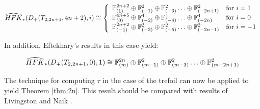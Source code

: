 





\begin{prop}
\label{prop:Kstart}
$$ \HFKa_*(D_+(T_{2,2n+1},4n+2),i)\cong 
\left\{\begin{array}{ll}

	\F_{(1)}^{2n+2}\oplus\F_{(-1)}^2\oplus\F_{(-3)}^2\ldots \oplus\F_{(-2n+1)}^2  & {\text{for
 $i=1$}} \\

 \F_{(0)}^{4n+5}\oplus\F_{(-2)}^4\oplus\F_{(-4)}^4\ldots \oplus\F_{(-2n)}^4  & {\text{for
 $i=0$}} \\

	\F_{(-1)}^{2n+2}\oplus\F_{(-3)}^2\oplus\F_{(-5)}^2\ldots \oplus\F_{(-2n-1)}^2  & {\text{for
 $i=-1$}} \\

 
\end{array}
\right. $$
\end{prop}

In addition, Eftekhary's \cite{Eaman} results in this case yield:

\begin{theorem}
	\label{prop:eaman}
	
$$ \widehat{HFK}_*(D_+(T_{2,2n+1},0),1)\cong \mathbb F_{(m)}^{2n}\oplus\mathbb F_{(m-1)}^2\oplus\mathbb F_{(m-3)}^2\ldots \oplus\mathbb F_{(m-2n+1)}^2 $$

\end{theorem}

The technique for computing $\tau$ in the case of the trefoil can now be applied to yield Theorem \ref{thm:2n}.  This result should be compared with results of Livingston and Naik \cite{Livingston2}.



